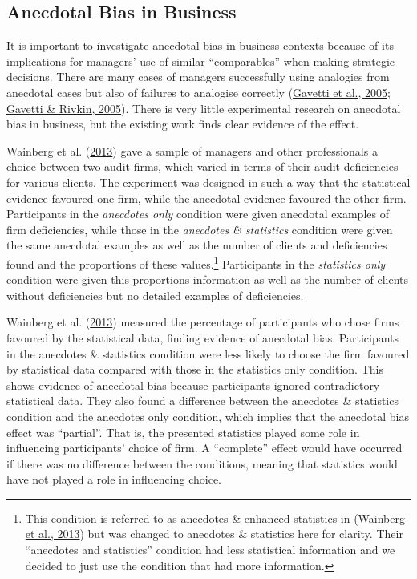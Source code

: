 \documentclass[
  man, donotrepeattitle,floatsintext]{apa7}
\theoremstyle{definition}
\theoremstyle{definition}
\theoremstyle{definition}
\theoremstyle{definition}
\theoremstyle{remark}
\begin{document}
\hypertarget{anecdotal-bias-in-business}{%
\subsection{Anecdotal Bias in Business}\label{anecdotal-bias-in-business}}

It is important to investigate anecdotal bias in business contexts because of
its implications for managers' use of similar ``comparables'' when making
strategic decisions. There are many cases of managers successfully using
analogies from anecdotal cases but also of failures to analogise correctly
(\protect\hyperlink{ref-gavetti2005}{Gavetti et al., 2005}; \protect\hyperlink{ref-gavetti2005a}{Gavetti \& Rivkin, 2005}). There is very little experimental research on
anecdotal bias in business, but the existing work finds clear evidence of the
effect.

Wainberg et al. (\protect\hyperlink{ref-wainberg2013}{2013}) gave a sample of managers and other professionals a choice between
two audit firms, which varied in terms of their audit deficiencies for various
clients. The experiment was designed in such a way that the statistical evidence
favoured one firm, while the anecdotal evidence favoured the other firm.
Participants in the \emph{anecdotes only} condition were given anecdotal examples of
firm deficiencies, while those in the \emph{anecdotes \& statistics} condition were
given the same anecdotal examples as well as the number of clients and
deficiencies found and the proportions of these values.\footnote{This condition is referred to as anecdotes \& enhanced
  statistics in (\protect\hyperlink{ref-wainberg2013}{Wainberg et al., 2013}) but was changed to anecdotes \& statistics here for
  clarity. Their ``anecdotes and statistics'' condition had less statistical
  information and we decided to just use the condition that had more information.}
Participants in the \emph{statistics only} condition were given this proportions
information as well as the number of clients without deficiencies but no
detailed examples of deficiencies.

Wainberg et al. (\protect\hyperlink{ref-wainberg2013}{2013}) measured the percentage of participants who chose firms favoured
by the statistical data, finding evidence of anecdotal bias. Participants in the
anecdotes \& statistics condition were less likely to choose the firm favoured by
statistical data compared with those in the statistics only condition. This
shows evidence of anecdotal bias because participants ignored contradictory
statistical data. They also found a difference between the anecdotes \&
statistics condition and the anecdotes only condition, which implies that the
anecdotal bias effect was ``partial''. That is, the presented statistics played
some role in influencing participants' choice of firm. A ``complete'' effect would
have occurred if there was no difference between the conditions, meaning that
statistics would have not played a role in influencing choice.
\end{document}

